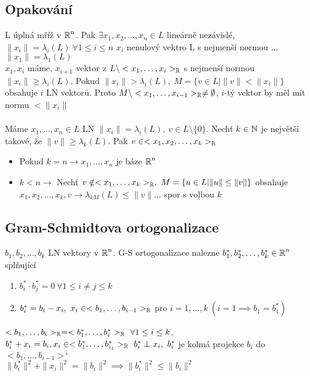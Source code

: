 \subsection{Opakování}
L úplná mříž v $\operatorname{\mathbb{R}}^n$. Pak $\exists x_1,x_2,\ldots,x_n\in L$ lineárně nezávislé, $\|x_i\|=\lambda_i(L)\ \forall 1\leq i\leq n$
$x_i$ nenulový vektro L s nejmenší normou ... $\|x_1\|=\lambda_1(L)$\\
$x_1,x_i$ máme, $x_{i+1}$ vektor z $L\setminus <x_1,\ldots,x_i>_{\operatorname{\mathbb{R}}}$ s nejmenší normou\\
$\|x_i\|\geq\lambda_i(L)$. Pokud $\|x_i\|>\lambda_i(L),\ M=\{v\in L | \|v\|<\|x_i\| \}$ obsahuje $i$ LN vektorů. Proto $M\setminus <x_1,\ldots,x_{i-1}>_{\operatorname{\mathbb{R}}} \neq\emptyset$, $i$-tý vektor by měl mít normu $<\|x_i\|$\\
\\
Máme $x_1,\ldots,x_n\in L$ LN $\|x_i\|=\lambda_i(L),\ v\in L\setminus\{0\}$. Nechť $k\in \operatorname{\mathbb{N}}$ je největší takové, že $\|v\|\geq\lambda_k(L)$. Pak $v\in <x_1,x_2,\ldots,x_k>_{\operatorname{\mathbb{R}}}$
\begin{itemize}
    \item Pokud $k=n\rightarrow x_1,\ldots,x_n$ je báze $\operatorname{\mathbb{R}}^n$
    \item $k<n\rightarrow$ Nechť $v\notin<x_1,\ldots,x_k>_{\Real},\ M=\{u\in L | \|u\|\leq\|v\| \}$ obsahuje $x_1,x_2,\ldots,x_k,v\rightarrow\lambda_{kM}(L)\leq\|v\|\ldots$ spor s volbou $k$
\end{itemize}


\subsection{Gram-Schmidtova ortogonalizace}

$b_1,b_2,\ldots,b_k$ LN vektory v $\operatorname{\mathbb{R}}^n$. G-S ortogonalizace nalezne $b_1^*,b_2^*,\ldots,b_k^*\in \operatorname{\mathbb{R}}^n$ splňující
\begin{enumerate}
    \item $b_i^*\cdot b_j^*=0\ \forall 1\leq i \neq j \leq k$
    \item $b_i^*=b_i -x_i,\ x_i\in<b_1,\ldots,b_{i-1}>_{\Real}$ pro $i=1,\ldots,k\ (i=1\implies b_1=b_1^*)$
\end{enumerate}

\begin{note}
$<b_1,\ldots,b_i>_{\Real}=<b_1^*,\ldots,b_i^*>_{\Real}\ \forall 1\leq i\leq k$, $b_i^*+x_i=b_i, x_i\in <b_1^*,\ldots,b_{i_1}^*>_{\Real}\ b_i^* \perp x_i,\ b_i^*$ je kolmá projekce $b_i$ do $<b_1,\ldots,b_{i-1}>^{\perp}$\\
$\|b_i^*\|^2+\|x_i\|^2=\|b_i\|^2\implies\|b_i^*\|^2\leq \|b_i\|^2$
\end{note}

